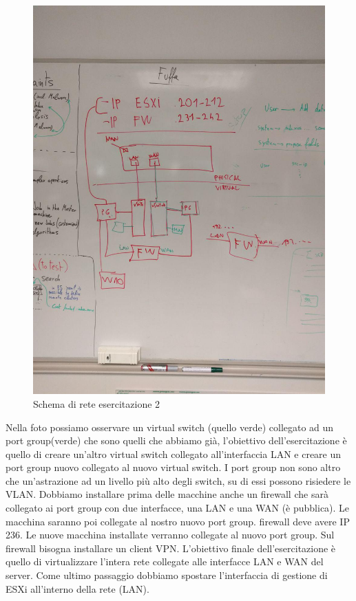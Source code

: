 \documentclass{article}
\begin{document}
\begin{figure}[H]
    \center
    \includegraphics[scale=0.3]{images/schemaEs2.jpg}
    \caption{Schema di rete esercitazione 2}\label{fig:1}
\end{figure}

\noindent Nella foto possiamo osservare un virtual switch (quello verde) collegato ad un port group(verde)
che sono quelli che abbiamo già, l'obiettivo dell'esercitazione è quello di creare un'altro virtual switch collegato all'interfaccia
LAN e creare un port group nuovo collegato al nuovo virtual switch. I port group non sono altro che un'astrazione ad un livello più alto degli switch,
su di essi possono risiedere le VLAN.
Dobbiamo installare prima delle macchine anche un firewall che sarà collegato ai port group con due interfacce, una LAN e una WAN (è pubblica).
Le macchina saranno poi collegate al nostro nuovo port group.
firewall deve avere IP 236. Le nuove macchina installate verranno collegate al nuovo port group.
Sul firewall bisogna installare un client VPN.
L'obiettivo finale dell'esercitazione è quello di virtualizzare l'intera rete collegate alle interfacce LAN e WAN del server.
Come ultimo passaggio dobbiamo spostare l’interfaccia di gestione di ESXi all’interno della rete (LAN).
\end{document}
